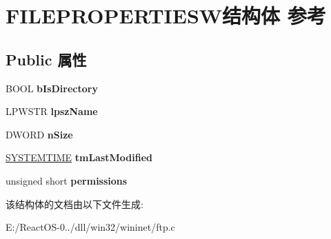 \hypertarget{struct_f_i_l_e_p_r_o_p_e_r_t_i_e_s_w}{}\section{F\+I\+L\+E\+P\+R\+O\+P\+E\+R\+T\+I\+E\+S\+W结构体 参考}
\label{struct_f_i_l_e_p_r_o_p_e_r_t_i_e_s_w}
\subsection*{Public 属性}
\begin{DoxyCompactItemize}
\item 
\mbox{\label{struct_f_i_l_e_p_r_o_p_e_r_t_i_e_s_w_adcdefc970f8d1c7d6f85cf29c632103f}} 
B\+O\+OL {\bfseries b\+Is\+Directory}
\item 
\mbox{\label{struct_f_i_l_e_p_r_o_p_e_r_t_i_e_s_w_a2618e9500005b1aaf5fadc407f90adf1}} 
L\+P\+W\+S\+TR {\bfseries lpsz\+Name}
\item 
\mbox{\label{struct_f_i_l_e_p_r_o_p_e_r_t_i_e_s_w_a88f3c2963433c422004ecfa14b0422a4}} 
D\+W\+O\+RD {\bfseries n\+Size}
\item 
\mbox{\label{struct_f_i_l_e_p_r_o_p_e_r_t_i_e_s_w_a6d5fd39f91f5d9b4193a939a2c11231c}} 
\hyperlink{struct___s_y_s_t_e_m_t_i_m_e}{S\+Y\+S\+T\+E\+M\+T\+I\+ME} {\bfseries tm\+Last\+Modified}
\item 
\mbox{\label{struct_f_i_l_e_p_r_o_p_e_r_t_i_e_s_w_ab15600b54b6b169fff693cbde7652a56}} 
unsigned short {\bfseries permissions}
\end{DoxyCompactItemize}


该结构体的文档由以下文件生成\+:\begin{DoxyCompactItemize}
\item 
E\+:/\+React\+O\+S-\/0../dll/win32/wininet/ftp.\+c\end{DoxyCompactItemize}
